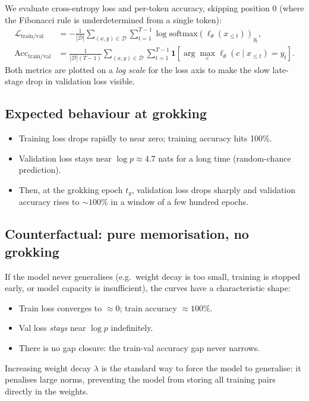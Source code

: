 \documentclass[11pt]{article}
\begin{document}
We evaluate cross-entropy loss and per-token accuracy, skipping position 0
(where the Fibonacci rule is underdetermined from a single token):
\begin{align}
    \mathcal{L}_{\text{train/val}}
    &= -\frac{1}{|\mathcal{D}|}\sum_{(x,y)\in\mathcal{D}}
       \sum_{t=1}^{T-1} \log \text{softmax}(\ell_\theta(x_{\leq t}))_{y_t},\\
    \text{Acc}_{\text{train/val}}
    &= \frac{1}{|\mathcal{D}|(T-1)}
       \sum_{(x,y)\in\mathcal{D}} \sum_{t=1}^{T-1}
       \mathbf{1}\!\left[\arg\max_c \ell_\theta(c\mid x_{\leq t}) = y_t\right].
\end{align}
Both metrics are plotted on a \emph{log scale} for the loss axis to make the
slow late-stage drop in validation loss visible.

\subsection{Expected behaviour at grokking}

\begin{itemize}
    \item Training loss drops rapidly to near zero; training accuracy hits 100\%.
    \item Validation loss stays near $\log p \approx 4.7$ nats for a long time
    (random-chance prediction).
    \item Then, at the grokking epoch $t_g$, validation loss drops sharply and
    validation accuracy rises to $\sim 100\%$ in a window of a few hundred epochs.
\end{itemize}

\subsection{Counterfactual: pure memorisation, no grokking}

If the model never generalises (e.g.\ weight decay is too small, training is
stopped early, or model capacity is insufficient), the curves have a
characteristic shape:
\begin{itemize}
    \item Train loss converges to $\approx 0$; train accuracy $\approx 100\%$.
    \item Val loss \emph{stays} near $\log p$ indefinitely.
    \item There is no gap closure: the train-val accuracy gap never narrows.
\end{itemize}
Increasing weight decay $\lambda$ is the standard way to force the model to
generalise: it penalises large norms, preventing the model from storing all
training pairs directly in the weights.
\end{document}
